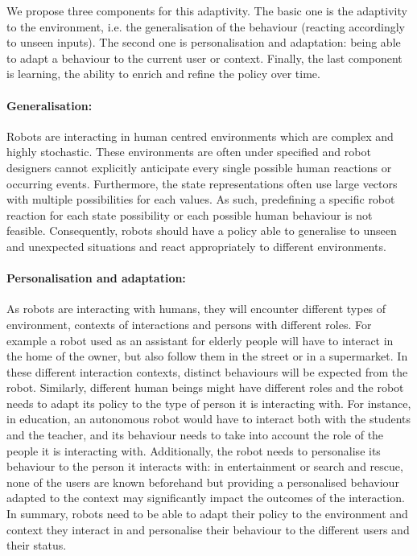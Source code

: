 We propose three components for this adaptivity. The basic one is the adaptivity to the environment, i.e. the generalisation of the behaviour (reacting accordingly to unseen inputs). The second one is personalisation and adaptation: being able to adapt a behaviour to the current user or context. Finally, the last component is learning, the ability to enrich and refine the policy over time. 
   
\paragraph{Generalisation:} 
Robots are interacting in human centred environments which are complex and highly stochastic. These environments are often under specified and robot designers cannot explicitly anticipate every single possible human reactions or occurring events. Furthermore, the state representations often use large vectors with multiple possibilities for each values. As such, predefining a specific robot reaction for each state possibility or each possible human behaviour is not feasible. Consequently, robots should have a policy able to generalise to unseen and unexpected situations and react appropriately to different environments.

\paragraph{Personalisation and adaptation:}
As robots are interacting with humans, they will encounter different types of environment, contexts of interactions and persons with different roles. For example a robot used as an assistant for elderly people will have to interact in the home of the owner, but also follow them in the street or in a supermarket. In these different interaction contexts, distinct behaviours will be expected from the robot. Similarly, different human beings might have different roles and the robot needs to adapt its policy to the type of person it is interacting with. For instance, in education, an autonomous robot would have to interact both with the students and the teacher, and its behaviour needs to take into account the role of the people it is interacting with. Additionally, the robot needs to personalise its behaviour to the person it interacts with: in entertainment or search and rescue, none of the users are known beforehand but providing a personalised behaviour adapted to the context may significantly impact the outcomes of the interaction. In summary, robots need to be able to adapt their policy to the environment and context they interact in and personalise their behaviour to the different users and their status.

